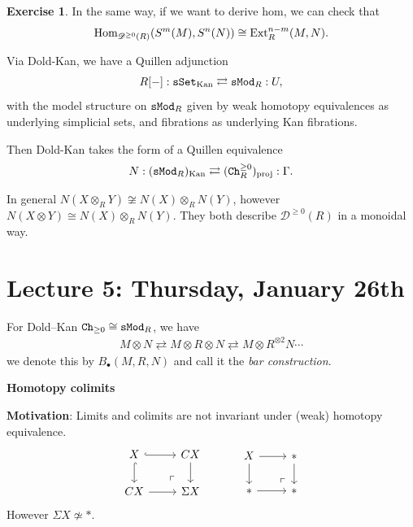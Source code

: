 \documentclass[12pt]{amsart}
\theoremstyle{definition}
\newtheorem{exercise}[theorem]{Exercise}
\begin{document}
\begin{exercise} In the same way, if we want to derive hom, we can check that
\begin{align*}
    \text{Hom}_{\mathscr{D}^{\ge 0}(R)}(S^m(M), S^n(N))\cong \text{Ext}_R^{n-m}(M,N).
\end{align*}
\end{exercise}

Via Dold-Kan, we have a Quillen adjunction
\begin{align*}
    R[-]:\texttt{sSet}_\text{Kan} \rightleftarrows \texttt{sMod}_R : U,
\end{align*}
with the model structure on $\texttt{sMod}_R$ given by weak homotopy equivalences as underlying simplicial sets, and fibrations as underlying Kan fibrations.

Then Dold-Kan takes the form of a Quillen equivalence
\begin{align*}
    N:(\texttt{sMod}_R)_\text{Kan} \rightleftarrows (\texttt{Ch}_R^{\ge 0})_\text{proj}: \Gamma.
\end{align*}

In general $N(X \otimes_R Y) \not\cong N(X) \otimes_R N(Y)$, however $N(X \otimes Y) \cong N(X) \otimes_R N(Y)$. They both describe $\mathscr{D}^{\ge 0}(R)$ in a monoidal way.



\section{Lecture 5: Thursday, January 26th}

For Dold--Kan $\texttt{Ch}_{\ge 0} \cong \texttt{sMod}_R$, we have
\begin{align*}
    M \otimes N \rightleftarrows M \otimes R \otimes N \rightleftarrows M \otimes R^{\otimes 2} N \cdots
\end{align*}
we denote this by $B_\bullet(M,R,N)$ and call it the \textit{bar construction}.

\begin{center}
    \textbf{Homotopy colimits}
\end{center}

\textbf{Motivation}: Limits and colimits are not invariant under (weak) homotopy equivalence.
\[ \begin{tikzcd}
    X\rar[hook]\dar[hook] & CX\dar\\
    CX\rar & \Sigma X\po
\end{tikzcd} \quad\quad\quad \begin{tikzcd}
    X\rar\dar & \ast\dar\\
    \ast\rar & \ast\po
\end{tikzcd} \]
However $\Sigma X \not\simeq \ast$.
\end{document}
